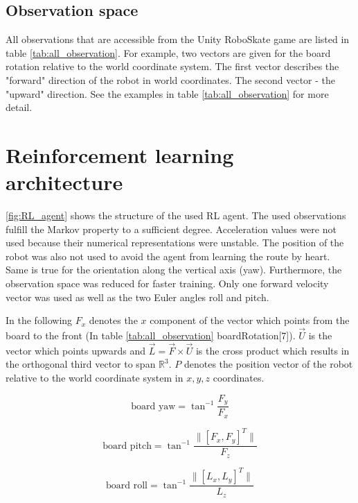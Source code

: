 \documentclass[conference]{IEEEtran}
\begin{document}
\subsection{Observation space}
All observations that are accessible from the Unity RoboSkate game are listed in table \ref{tab:all_observation}. For example, two vectors are given for the board rotation relative to the world coordinate system. The first vector describes the "forward" direction of the robot in world coordinates. The second vector - the "upward" direction. See the examples in table \ref{tab:all_observation} for more detail.


\section{Reinforcement learning architecture}
\figurename  \ref{fig:RL_agent} shows the structure of the used RL agent. The used observations fulfill the Markov property to a sufficient degree. Acceleration values were not used because their numerical representations were unstable. The position of the robot was also not used to avoid the agent from learning the route by heart. Same is true for the orientation along the vertical axis (yaw).
Furthermore, the observation space was reduced for faster training. Only one forward velocity vector was used as well as the two Euler angles roll and pitch.

In the following $F_x$ denotes the $x$ component of the vector which points from the board to the front (In table \ref{tab:all_observation} boardRotation[7]). $\vec{U}$ is the vector which points upwards and $ \vec{L} = \vec{F} \times \vec{U} $ is the cross product which results in the orthogonal third vector to span $\mathds{R}^3$. $P$ denotes the position vector of the robot relative to the world coordinate system in $x, y, z $ coordinates. %


\begin{equation}
\text{board yaw} = \tan ^{-1} \frac{F_y}{F_x}
\end{equation}

\begin{equation}
\text{board pitch} = \tan ^{-1} \frac{\lVert [F_x , F_y]^T \rVert}{F_z}
\end{equation}

\begin{equation}
\text{board roll} = \tan ^{-1} \frac{\lVert [L_x , L_y]^T \rVert}{L_z}
\end{equation}
\end{document}
